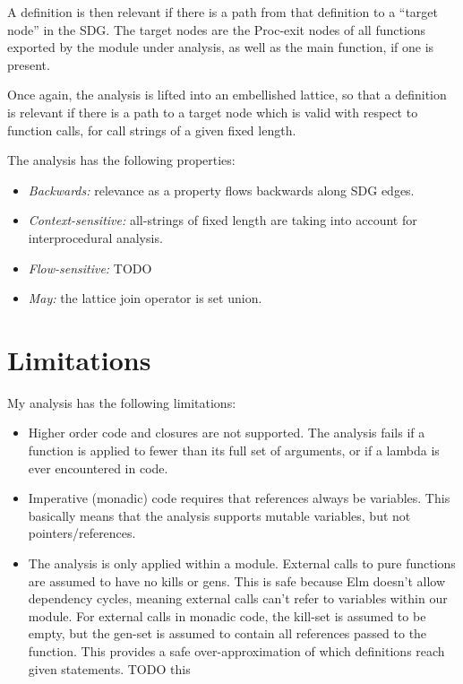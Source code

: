 \documentclass{article}
\begin{document}
A definition is then relevant if there is a path from that definition to a ``target node'' in the SDG. The target nodes are the Proc-exit nodes of all functions exported by the module under analysis, as well as the main function, if one is present.

Once again, the analysis is lifted into an embellished lattice, so that a definition is relevant if there is a path to a target node which is valid with respect to function calls, for call strings of a given fixed length.

The analysis has the following properties:

\begin{itemize}
\item \textit{Backwards:} relevance as a property flows backwards along SDG edges.
\item \textit{Context-sensitive:} all-strings of fixed length are taking into account for interprocedural analysis.
\item \textit{Flow-sensitive:} TODO
\item \textit{May:} the lattice join operator is set union.
\end{itemize}



\section{Limitations}

My analysis has the following limitations:

\begin{itemize}
\item
  Higher order code and closures are not supported. The analysis fails if a function is applied to fewer than its full set of arguments, or if a lambda is ever encountered in code.
\item
  Imperative (monadic) code requires that references always be variables. This basically means that the analysis supports mutable variables, but not pointers/references.
\item
  The analysis is only applied within a module. External calls to pure functions are assumed to have no kills or gens. This is safe because Elm doesn't allow dependency cycles, meaning external calls can't refer to variables within our module. For external calls in monadic code, the kill-set is assumed to be empty, but the gen-set is assumed to contain all references passed to the function. This provides a safe over-approximation of which definitions reach given statements. TODO this
\end{itemize}
\end{document}
